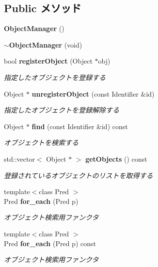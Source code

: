\subsection*{Public メソッド}
\begin{DoxyCompactItemize}
\item 
{\bf ObjectManager} ()
\item 
{\bf $\sim$ObjectManager} (void)
\item 
bool {\bf registerObject} (Object $\ast$obj)
\begin{DoxyCompactList}\small\item\em 指定したオブジェクトを登録する \item\end{DoxyCompactList}\item 
Object $\ast$ {\bf unregisterObject} (const Identifier \&id)
\begin{DoxyCompactList}\small\item\em 指定したオブジェクトを登録解除する \item\end{DoxyCompactList}\item 
Object $\ast$ {\bf find} (const Identifier \&id) const 
\begin{DoxyCompactList}\small\item\em オブジェクトを検索する \item\end{DoxyCompactList}\item 
std::vector$<$ Object $\ast$ $>$ {\bf getObjects} () const 
\begin{DoxyCompactList}\small\item\em 登録されているオブジェクトのリストを取得する \item\end{DoxyCompactList}\item 
{\footnotesize template$<$class Pred $>$ }\\Pred {\bf for\_\-each} (Pred p)
\begin{DoxyCompactList}\small\item\em オブジェクト検索用ファンクタ \item\end{DoxyCompactList}\item 
{\footnotesize template$<$class Pred $>$ }\\Pred {\bf for\_\-each} (Pred p) const 
\begin{DoxyCompactList}\small\item\em オブジェクト検索用ファンクタ \item\end{DoxyCompactList}\end{DoxyCompactItemize}
